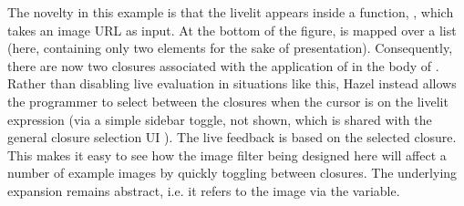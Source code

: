 The novelty in this example is that the livelit appears inside a function, 
, which takes an image URL as input. At the bottom 
of the figure,  is mapped over a list (here, containing only 
two elements for the sake of presentation). Consequently, there are now 
two closures associated with the application of  in the 
body of . Rather than disabling live evaluation in situations like 
this, Hazel instead allows the programmer to select between the closures when 
the cursor is on the livelit expression (via a simple sidebar toggle, not shown, which is shared 
with the general closure selection UI \cite{HazelnutLive}). 
The live feedback is based on the selected closure.
This makes it easy to see how the image filter being designed here will affect a
number of example images by quickly toggling between closures. The underlying expansion remains abstract, i.e. it refers to the image via the  variable.


